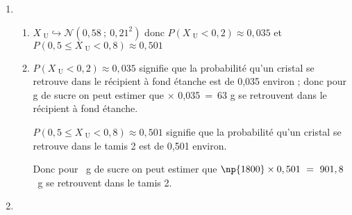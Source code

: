 \documentclass[11pt,a4paper,answers,fancyhdr]{exam}
\newcommand{\pp}{\leqslant}
\newcommand{\normale}[2]{\hookrightarrow \mathcal{N}\left(#1~;~#2^2 \right) }
\newcommand{\x}{\times}
\begin{document}
\begin{enumerate}
\item %
	\begin{enumerate}
		\item %
	
\begin{solution}
	
$X_{\text{ U}} \normale{0,58}{0,21}$ donc $P\left(X_{\text{ U}}<0,2 \right)\approx 0,035$ et $P\left(0,5 \pp X_{\text{ U}}<0,8 \right)\approx 0,501$  
\end{solution}
	
		\item %
	

\begin{solution}
$P\left(X_{\text{ U}}<0,2 \right)\approx 0,035$ signifie que la probabilité qu'un cristal se retrouve dans le récipient à fond étanche est de 0,035 environ ; 
donc pour g de sucre on peut estimer que $\x$ 0,035~=~63 g se retrouvent dans le récipient à fond étanche.

\vspace{0.3cm}
$P\left(0,5 \pp X_{\text{ U}}<0,8 \right)\approx 0,501$ signifie que la probabilité qu'un cristal se retrouve dans le tamis 2 est de 0,501 environ.

Donc pour ~g de sucre on peut estimer que $\np{1800} \times 0,501~=~901,8$~g se retrouvent dans le tamis 2.
\end{solution}
 		\end{enumerate}

\item %


\end{enumerate}
\end{document}
